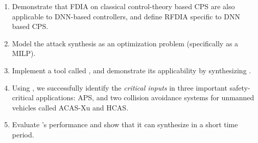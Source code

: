 \begin{enumerate}
	\item Demonstrate that FDIA on classical control-theory based CPS are also applicable to DNN-based controllers, and define RFDIA specific to DNN based CPS. %
	\item Model the attack synthesis as an optimization problem (specifically as a MILP). %
	
	\item Implement a tool called \tool, and demonstrate its applicability by synthesizing \attack.%
	\item Using \tool, we successfully identify the \textit{critical inputs} in three important safety-critical applications: \ac{APS},  and  two collision avoidance systems for unmanned vehicles called \ac{ACAS-Xu} and \ac{HCAS}.
	\item Evaluate \tool's performance and show that it can synthesize \attack in a short time period.   %
\end{enumerate}


